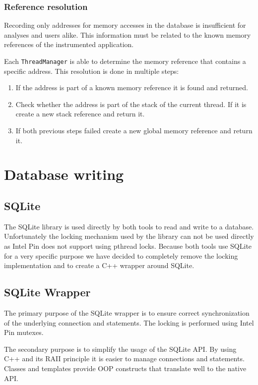 \subsubsection{Reference resolution}

Recording only addresses for memory accesses in the database is insufficient for analyses and users alike. This information must be related to the known memory references of the instrumented application.

Each \texttt{ThreadManager} is able to determine the memory reference that contains a specific address. This resolution is done in multiple steps:

\begin{enumerate}
	\item If the address is part of a known memory reference it is found and returned.
	\item Check whether the address is part of the stack of the current thread. If it is create a new stack reference and return it.
	\item If both previous steps failed create a new global memory reference and return it.
\end{enumerate}

\section{Database writing}

\subsection{SQLite}

The SQLite library \cite{sqlitedoc} is used directly by both tools to read and write to a database. Unfortunately the locking mechanism used by the library can not be used directly as Intel Pin does not support using pthread locks. Because both tools use SQLite for a very specific purpose  we have decided to completely remove the locking implementation and to create a C++ wrapper around SQLite.

\subsection{SQLite Wrapper}

The primary purpose of the SQLite wrapper is to ensure correct synchronization of the underlying connection and statements. The locking is performed using Intel Pin mutexes.

The secondary purpose is to simplify the usage of the SQLite API. By using C++ and its RAII principle it is easier to manage connections and statements. Classes and templates provide OOP constructs that translate well to the native API.

